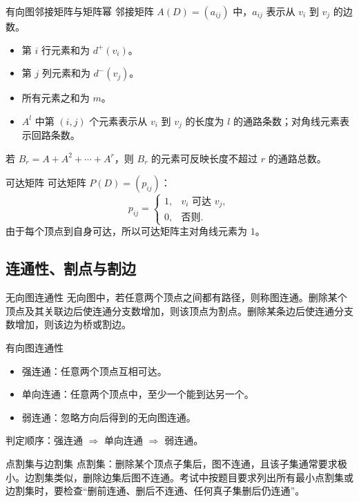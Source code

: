 \documentclass[UTF8,zihao=-4]{ctexart}
\begin{document}
\begin{corebox}{有向图邻接矩阵与矩阵幂}
邻接矩阵 $A(D)=(a_{ij})$ 中，$a_{ij}$ 表示从 $v_i$ 到 $v_j$ 的边数。
\begin{itemize}
  \item 第 $i$ 行元素和为 $d^+(v_i)$。
  \item 第 $j$ 列元素和为 $d^-(v_j)$。
  \item 所有元素之和为 $m$。
  \item $A^l$ 中第 $(i,j)$ 个元素表示从 $v_i$ 到 $v_j$ 的长度为 $l$ 的通路条数；对角线元素表示回路条数。
\end{itemize}
若 $B_r=A+A^2+\cdots+A^r$，则 $B_r$ 的元素可反映长度不超过 $r$ 的通路总数。
\end{corebox}

\begin{corebox}{可达矩阵}
可达矩阵 $P(D)=(p_{ij})$：
\[
p_{ij}=\begin{cases}
1,&v_i\text{ 可达 }v_j,\\
0,&\text{否则}.
\end{cases}
\]
由于每个顶点到自身可达，所以可达矩阵主对角线元素为 $1$。
\end{corebox}

\subsection{连通性、割点与割边}

\begin{corebox}{无向图连通性}
无向图中，若任意两个顶点之间都有路径，则称图连通。删除某个顶点及其关联边后使连通分支数增加，则该顶点为割点。删除某条边后使连通分支数增加，则该边为桥或割边。
\end{corebox}

\begin{corebox}{有向图连通性}
\begin{itemize}
  \item 强连通：任意两个顶点互相可达。
  \item 单向连通：任意两个顶点中，至少一个能到达另一个。
  \item 弱连通：忽略方向后得到的无向图连通。
\end{itemize}
判定顺序：强连通 $\Rightarrow$ 单向连通 $\Rightarrow$ 弱连通。
\end{corebox}

\begin{methodbox}{点割集与边割集}
点割集：删除某个顶点子集后，图不连通，且该子集通常要求极小。边割集类似，删除边集后图不连通。考试中按题目要求列出所有最小点割集或边割集时，要检查“删前连通、删后不连通、任何真子集删后仍连通”。
\end{methodbox}
\end{document}
